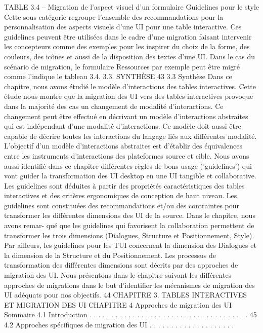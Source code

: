 \documentclass{article}
\begin{document}
 
TABLE 3.4 – Migration de l’aspect visuel d’un formulaire
Guidelines pour le style
Cette sous-catégorie regroupe l’ensemble des recommandations pour la
personnalisation des aspects visuels d’une UI pour une table interactive. Ces guidelines peuvent être
utilisées dans le cadre d’une migration faisant intervenir les concepteurs comme des exemples pour les
inspirer du choix de la forme, des couleurs, des icônes et aussi de la disposition des textes d’une UI.
Dans le cas du scénario de migration, le formulaire Ressources par exemple peut être migré comme
l’indique le tableau 3.4.
3.3. SYNTHÈSE
43
3.3
Synthèse
Dans ce chapitre, nous avons étudié le modèle d’interactions des tables interactives. Cette étude
nous montre que la migration des UI vers des tables interactives provoque dans la majorité des cas
un changement de modalité d’interactions. Ce changement peut être effectué en décrivant un modèle
d’interactions abstraites qui est indépendant d’une modalité d’interactions. Ce modèle doit aussi être
capable de décrire toutes les interactions du langage liés aux différentes modalité. L’objectif d’un
modèle d’interactions abstraites est d’établir des équivalences entre les instruments d’interactions des
plateformes source et cible.
Nous avons aussi identiﬁé dans ce chapitre différentes règles de bons usage (’guidelines’) qui
vont guider la transformation des UI desktop en une UI tangible et collaborative. Les guidelines sont
déduites à partir des propriétés caractéristiques des tables interactives et des critères ergonomiques de
conception de haut niveau. Les guidelines sont constituées des recommandations et/ou des contraintes
pour transformer les différentes dimensions des UI de la source. Dans le chapitre, nous avons remar-
qué que les guidelines qui favorisent la collaboration permettent de transformer les trois dimensions
(Dialogues, Structure et Positionnement, Style). Par ailleurs, les guidelines pour les TUI concernent
la dimension des Dialogues et la dimension de la Structure et du Positionnement.
Les processus de transformation des différentes dimensions sont décrits par des approches de
migration des UI. Nous présentons dans le chapitre suivant les différentes approches de migrations
dans le but d’identiﬁer les mécanismes de migration des UI adéquats pour nos objectifs.
44
CHAPITRE 3. TABLES INTERACTIVES ET MIGRATION DES UI
CHAPITRE 4
Approches de migration des UI
Sommaire
4.1
Introduction . . . . . . . . . . . . . . . . . . . . . . . . . . . . . . . . . . . . .
45
4.2
Approches spéciﬁques de migration des UI
. . . . . . . . . . . . . . . . . . . .
\end{document}
